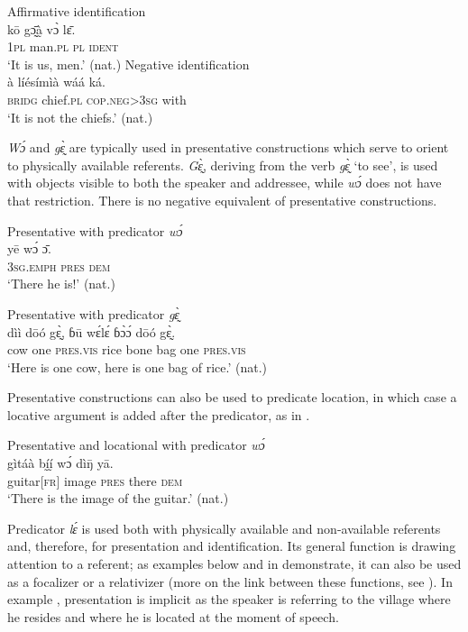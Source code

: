 \documentclass[output=paper,colorlinks,citecolor=brown]{langscibook}
\begin{document}
\ea\label{ex:mano:40}Affirmative identification\\
    \gll kō gɔ̰̄à̰ vɔ̀  lɛ̄.  \\
        \textsc{1pl} man.\textsc{pl} \textsc{pl} \textsc{ident} \\
    \glt ‘It is us, men.’ (nat.)
\z
\newpage
\ea\label{ex:mano:41}Negative identification\\
    \gll à líésímìà wáá ká.\\
     \textsc{bridg} chief.\textsc{pl} \textsc{cop.neg>3sg} with\\
    \glt ‘It is not the chiefs.’ (nat.)
\z

\textit{Wɔ́}  and \textit{gɛ̰̀}  are typically used in presentative constructions which serve to orient to physically available referents. \textit{Gɛ̰̀}, deriving from the verb \textit{gɛ̰̀} ‘to see’, is used with objects visible to both the speaker and addressee, while \textit{wɔ́} does not have that restriction. There is no negative equivalent of presentative constructions.

\ea\label{ex:mano:42}Presentative with predicator \textit{wɔ́}\\
    \gll yē wɔ́ ɔ̄.\\
         \textsc{3sg.emph} \textsc{pres} \textsc{dem}\\
    \glt ‘There he is!’ (nat.)
\z


\ea\label{ex:mano:43}Presentative with predicator \textit{gɛ̰̀ }\\
    \gll dìì dōó gɛ̰̀, ɓū wɛ́lɛ́ ɓɔ̀ɔ́ dōó gɛ̰̀.  \\
        cow one \textsc{pres.vis} rice bone bag one \textsc{pres.vis} \\
    \glt ‘Here is one cow, here is one bag of rice.’ (nat.)
\z

Presentative constructions can also be used to predicate location, in which case a locative argument is added after the predicator, as in .

\ea\label{ex:mano:44}Presentative and locational with predicator \textit{wɔ́}\\
    \gll gìtáà bḭ́ḭ́ wɔ́ dìŋ̄ yā.\\
         guitar\textsc{[fr]} image \textsc{pres} there \textsc{dem}\\
    \glt ‘There is the image of the guitar.’ (nat.)
\z 

Predicator \textit{lɛ́ } is used both with physically available and non-available referents and, therefore, for presentation and identification. Its general function is drawing attention to a referent; as examples below and in  demonstrate, it can also be used as a focalizer or a relativizer (more on the link between these functions, see \citealt{KhachaturyanOzerov2021}). In example , presentation is implicit as the speaker is referring to the village where he resides and where he is located at the moment of speech.
\end{document}
